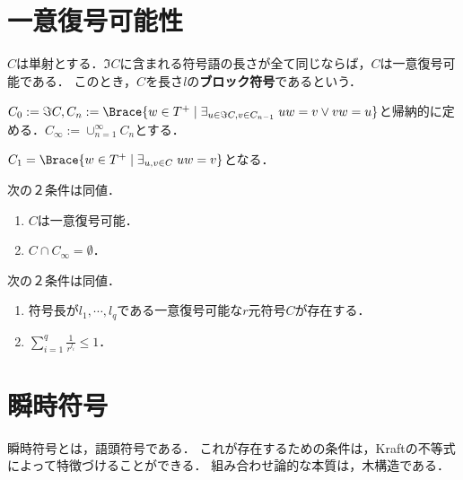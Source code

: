 \documentclass[uplatex,dvipdfmx]{jsreport}
\begin{document}
\section{一意復号可能性}

\begin{theorem}
    $C$は単射とする．$\Im C$に含まれる符号語の長さが全て同じならば，$C$は一意復号可能である．
    このとき，$C$を長さ$l$の\textbf{ブロック符号}であるという．
\end{theorem}

\begin{definition}
    $C_0:=\Im C,C_n:=\Brace{w\in T^+\mid\exists_{u\in\Im C,v\in C_{n-1}}\;uw=v\lor vw=u}$と帰納的に定める．$C_\infty:=\cup_{n=1}^\infty C_n$とする．
\end{definition}
\begin{remark}
    $C_1=\Brace{w\in T^+\mid\exists_{u,v\in C}\;uw=v}$となる．
\end{remark}

\begin{theorem}
    次の２条件は同値．
    \begin{enumerate}
        \item $C$は一意復号可能．
        \item $C\cap C_\infty=\emptyset$．
    \end{enumerate}
\end{theorem}

\begin{theorem}[McMillan 56]
    次の２条件は同値．
    \begin{enumerate}
        \item 符号長が$l_1,\cdots,l_q$である一意復号可能な$r$元符号$C$が存在する．
        \item $\sum^q_{i=1}\frac{1}{r^{l_i}}\le 1$．
    \end{enumerate}
\end{theorem}

\section{瞬時符号}

\begin{tcolorbox}[colframe=ForestGreen, colback=ForestGreen!10!white,breakable,colbacktitle=ForestGreen!40!white,coltitle=black,fonttitle=\bfseries\sffamily,
title=]
    瞬時符号とは，語頭符号である．
    これが存在するための条件は，Kraftの不等式によって特徴づけることができる．
    組み合わせ論的な本質は，木構造である．
\end{tcolorbox}
\end{document}
